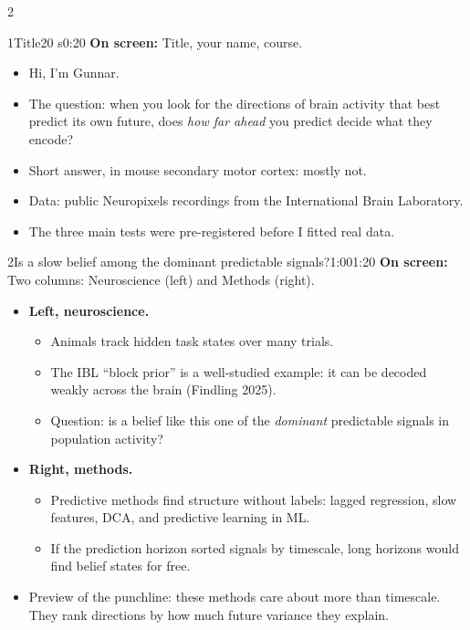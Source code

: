 \documentclass[10pt]{article}
\newcommand{\point}[1]{{\color{ink}\textbf{On screen:} #1}\par}
\begin{document}
\begin{multicols}{2}\raggedright
\begin{slidebox}{1}{Title}{20 s}{0:20}
\point{Title, your name, course.}
\begin{itemize}
\item Hi, I'm Gunnar.
\item The question: when you look for the directions of brain activity that best predict its own future, does
\emph{how far ahead} you predict decide what they encode?
\item Short answer, in mouse secondary motor cortex: mostly not.
\item Data: public Neuropixels recordings from the International Brain Laboratory.
\item The three main tests were pre-registered before I fitted real data.
\end{itemize}

\end{slidebox}
\begin{slidebox}{2}{Is a slow belief among the dominant predictable signals?}{1:00}{1:20}
\point{Two columns: Neuroscience (left) and Methods (right).}
\begin{itemize}
\item \textbf{Left, neuroscience.}
  \begin{itemize}
  \item Animals track hidden task states over many trials.
  \item The IBL ``block prior'' is a well-studied example: it can be decoded weakly across the brain (Findling 2025).
  \item Question: is a belief like this one of the \emph{dominant} predictable signals in population activity?
  \end{itemize}
\item \textbf{Right, methods.}
  \begin{itemize}
  \item Predictive methods find structure without labels: lagged regression, slow features, DCA, and predictive
  learning in ML.
  \item If the prediction horizon sorted signals by timescale, long horizons would find belief states for free.
  \end{itemize}
\item Preview of the punchline: these methods care about more than timescale. They rank directions by how much
future variance they explain.
\end{itemize}


\end{slidebox}
\end{multicols}
\end{document}

